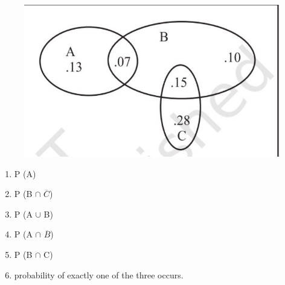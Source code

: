 \documentclass[12pt]{article}
\begin{document}
\begin{enumerate}
\begin{figure}[h!]                                   \includegraphics[width=\columnwidth]{figs/pic.jpg}                           \caption{}                                       \label{fig:1}                    \end{figure}
\begin{enumerate}
\item P (A)
\item P (B $\cap$ $\overline{C}$)
\item P (A $\cup$ B)
\item P (A $\cap$ $\overline{B}$)
\item P (B $\cap$ C)
\item probability of exactly one of the three occurs.
\end{enumerate}


\end{enumerate}
\end{document}
